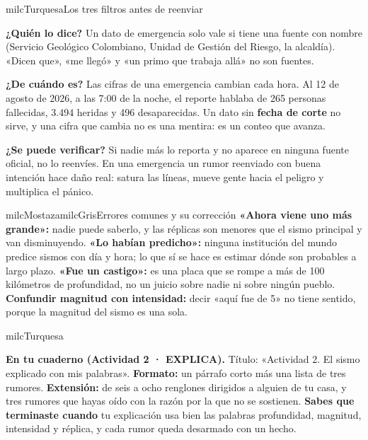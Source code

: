 \documentclass[11pt,letterpaper]{article}
\begin{document}
\begin{drawbox}{milcTurquesa}{Los tres filtros antes de reenviar}
\begin{pasoslista}
\item \textbf{¿Quién lo dice?} Un dato de emergencia solo vale si tiene una fuente con nombre (Servicio Geológico Colombiano, Unidad de Gestión del Riesgo, la alcaldía). «Dicen que», «me llegó» y «un primo que trabaja allá» no son fuentes.
\item \textbf{¿De cuándo es?} Las cifras de una emergencia cambian cada hora. Al 12 de agosto de 2026, a las 7:00 de la noche, el reporte hablaba de 265 personas fallecidas, 3.494 heridas y 496 desaparecidas. Un dato sin \textbf{fecha de corte} no sirve, y una cifra que cambia no es una mentira: es un conteo que avanza.
\item \textbf{¿Se puede verificar?} Si nadie más lo reporta y no aparece en ninguna fuente oficial, no lo reenvíes. En una emergencia un rumor reenviado con buena intención hace daño real: satura las líneas, mueve gente hacia el peligro y multiplica el pánico.
\end{pasoslista}
\end{drawbox}

\begin{softbox}{milcMostaza}{milcGris}{Errores comunes y su corrección}
\textbf{«Ahora viene uno más grande»:} nadie puede saberlo, y las réplicas son menores que el sismo principal y van disminuyendo. \textbf{«Lo habían predicho»:} ninguna institución del mundo predice sismos con día y hora; lo que sí se hace es estimar dónde son probables a largo plazo. \textbf{«Fue un castigo»:} es una placa que se rompe a más de 100 kilómetros de profundidad, no un juicio sobre nadie ni sobre ningún pueblo. \textbf{Confundir magnitud con intensidad:} decir «aquí fue de 5» no tiene sentido, porque la magnitud del sismo es una sola.
\end{softbox}

\begin{infoband}{milcTurquesa}


\textbf{En tu cuaderno (Actividad 2 · EXPLICA).} Título: «Actividad 2. El sismo explicado con mis palabras». \textbf{Formato:} un párrafo corto más una lista de tres rumores. \textbf{Extensión:} de seis a ocho renglones dirigidos a alguien de tu casa, y tres rumores que hayas oído con la razón por la que no se sostienen. \textbf{Sabes que terminaste cuando} tu explicación usa bien las palabras profundidad, magnitud, intensidad y réplica, y cada rumor queda desarmado con un hecho.
\end{infoband}
\end{document}
